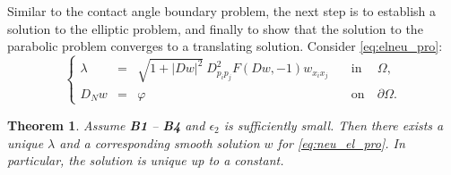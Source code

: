 \documentclass[12pt]{article}
\numberwithin{equation}{section}
\theoremstyle{plain}
\newtheorem{theorem}{Theorem}[section]
\theoremstyle{definition}
\theoremstyle{remark}
\begin{document}
Similar to the contact angle boundary problem, the next step is to establish a solution to the elliptic problem, and finally to show that the solution to the parabolic problem converges to a translating solution. Consider \eqref{eq:elneu_pro}:
\begin{equation} \label{eq:neu_el_pro}
    \left\{ \begin{array}{cllcl}
           \lambda  & = & \sqrt{1+|Dw|^2} \  D^2_{p_i p_j} F (Dw,-1) w_{x_i x_j}    \quad &  \text{in} &  \ \Omega , \\
            D_N w & = & \varphi  \quad &  \text{on} & \ \partial \Omega .  
    \end{array}  \right.
\end{equation}
\begin{theorem}
    Assume {\bf B1} -- {\bf B4} and 
 $\epsilon_2$ is sufficiently small. Then there exists a unique $\lambda$ and a corresponding smooth solution $w$ for \eqref{eq:neu_el_pro}. In particular, the solution is unique up to a constant. 
\end{theorem}
\end{document}
